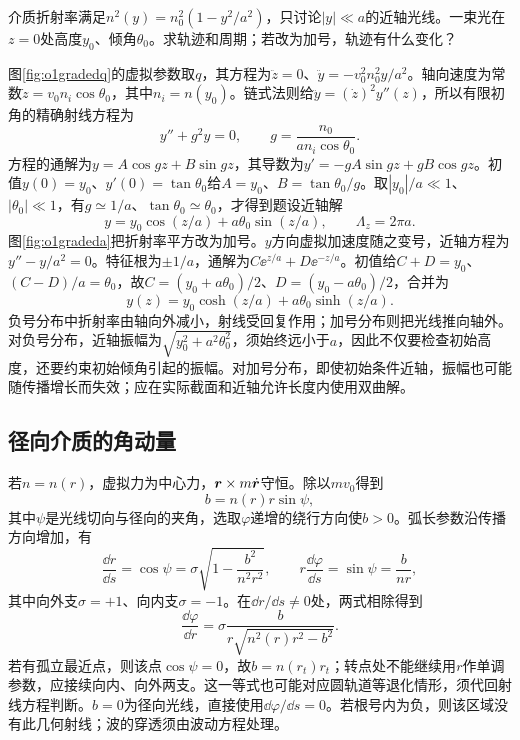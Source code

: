 \begin{example}\label{ex:o1graded}
介质折射率满足$n^2(y)=n_0^2(1-y^2/a^2)$，只讨论$|y|\ll a$的近轴光线。一束光在$z=0$处高度$y_0$、倾角$\theta_0$。求轨迹和周期；若改为加号，轨迹有什么变化？
\end{example}
\begin{solution}
图\ref{fig:o1gradedq}的虚拟参数取$q$，其方程为$\ddot z=0$、$\ddot y=-v_0^2n_0^2y/a^2$。轴向速度为常数$\dot z=v_0n_i\cos\theta_0$，其中$n_i=n(y_0)$。链式法则给$\ddot y=(\dot z)^2y''(z)$，所以有限初角的精确射线方程为
\[
 y''+g^2y=0,\qquad g=\frac{n_0}{a n_i\cos\theta_0}.
\]
方程的通解为$y=A\cos gz+B\sin gz$，其导数为$y'=-gA\sin gz+gB\cos gz$。初值$y(0)=y_0$、$y'(0)=\tan\theta_0$给$A=y_0$、$B=\tan\theta_0/g$。取$|y_0|/a\ll1$、$|\theta_0|\ll1$，有$g\simeq1/a$、$\tan\theta_0\simeq\theta_0$，才得到题设近轴解
\[
 y=y_0\cos(z/a)+a\theta_0\sin(z/a),\qquad\Lambda_z=2\pi a.
\]
图\ref{fig:o1gradeda}把折射率平方改为加号。$y$方向虚拟加速度随之变号，近轴方程为$y''-y/a^2=0$。特征根为$\pm1/a$，通解为$C\ee^{z/a}+D\ee^{-z/a}$。初值给$C+D=y_0$、$(C-D)/a=\theta_0$，故$C=(y_0+a\theta_0)/2$、$D=(y_0-a\theta_0)/2$，合并为
\[
 y(z)=y_0\cosh(z/a)+a\theta_0\sinh(z/a).
\]
负号分布中折射率由轴向外减小，射线受回复作用；加号分布则把光线推向轴外。对负号分布，近轴振幅为$\sqrt{y_0^2+a^2\theta_0^2}$，须始终远小于$a$，因此不仅要检查初始高度，还要约束初始倾角引起的振幅。对加号分布，即使初始条件近轴，振幅也可能随传播增长而失效；应在实际截面和近轴允许长度内使用双曲解。
\end{solution}

\subsection{径向介质的角动量}\label{th:o1central}
若$n=n(r)$，虚拟力为中心力，$\bm{r}\times m\dot{\bm{r}}$守恒。除以$mv_0$得到
\[
 b=n(r)r\sin\psi,
\]
其中$\psi$是光线切向与径向的夹角，选取$\varphi$递增的绕行方向使$b>0$。弧长参数沿传播方向增加，有
\[
 \frac{\dd r}{\dd s}=\cos\psi
 =\sigma\sqrt{1-\frac{b^2}{n^2r^2}},\qquad
 r\frac{\dd\varphi}{\dd s}=\sin\psi=\frac b{nr},
\]
其中向外支$\sigma=+1$、向内支$\sigma=-1$。在$\dd r/\dd s\ne0$处，两式相除得到
\[
 \frac{\dd\varphi}{\dd r}
 =\sigma\frac{b}{r\sqrt{n^2(r)r^2-b^2}}.
\]
若有孤立最近点，则该点$\cos\psi=0$，故$b=n(r_t)r_t$；转点处不能继续用$r$作单调参数，应接续向内、向外两支。这一等式也可能对应圆轨道等退化情形，须代回射线方程判断。$b=0$为径向光线，直接使用$\dd\varphi/\dd s=0$。若根号内为负，则该区域没有此几何射线；波的穿透须由波动方程处理。

